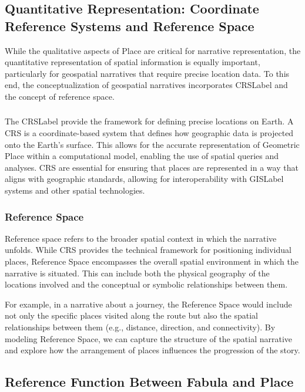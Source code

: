 \subsection{Quantitative Representation: Coordinate Reference Systems and Reference Space}\label{V-subsec:quantitative-representation}
While the qualitative aspects of Place are critical for narrative representation, the quantitative representation of spatial information is equally important, particularly for geospatial narratives that require precise location data. To this end, the conceptualization of geospatial narratives incorporates \acrshort{CRSLabel} and the concept of reference space.

\subsubsection{}\label{V-subsec:crs
}
The \acrshort{CRSLabel} provide the framework for defining precise locations on Earth. A CRS is a coordinate-based system that defines how geographic data is projected onto the Earth's surface. This allows for the accurate representation of Geometric Place within a computational model, enabling the use of spatial queries and analyses. CRS are essential for ensuring that places are represented in a way that aligns with geographic standards, allowing for interoperability with \acrshort{GISLabel} systems and other spatial technologies.

\subsubsection{Reference Space}\label{V-subsec:referenceSpace}
Reference space refers to the broader spatial context in which the narrative unfolds. While CRS provides the technical framework for positioning individual places, Reference Space encompasses the overall spatial environment in which the narrative is situated. This can include both the physical geography of the locations involved and the conceptual or symbolic relationships between them.

For example, in a narrative about a journey, the Reference Space would include not only the specific places visited along the route but also the spatial relationships between them (e.g., distance, direction, and connectivity). By modeling Reference Space, we can capture the structure of the spatial narrative and explore how the arrangement of places influences the progression of the story.

\subsection{Reference Function Between Fabula and Place}\label{V-subsec:referenceFunctionFabulaPlace}

